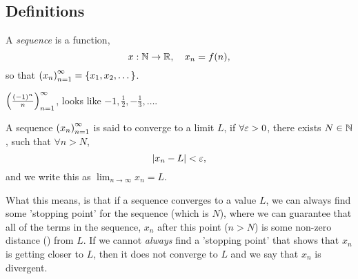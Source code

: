 \documentclass[12pt]{article}
\theoremstyle{definition}
\begin{document}
    \subsection{Definitions}
    \begin{definition}[Sequences]
        A \textit{sequence} is a function,
        \begin{equation*}
            x: \N \rightarrow \R, \quad x_{n} = f(n),
        \end{equation*}
        so that $\left(x_{n}\right)_{n = 1}^{\infty} = \left\{x_{1}, x_{2}, \dots\right\}$.
    \end{definition}
    \begin{eg}
        $\left(\frac{(-1)^{n}}{n}\right)_{n = 1}^{\infty}$, looks like  $-1, \frac{1}{2}, -\frac{1}{3}, \dots$. 
    \end{eg}

    \begin{definition}
        A sequence $\left(x_{n}\right)_{n = 1}^{\infty}$ is said to converge to a limit $L$, if $\forall \varepsilon > 0$, there exists $N \in \mathbb{N}$, such that $\forall n > N$,
        \begin{equation*}
            \left|x_{n} - L\right| < \varepsilon,
        \end{equation*}
        and we write this as $\displaystyle\lim_{n \rightarrow \infty}x_{n} = L$.
    \end{definition}

    What this means, is that if a sequence converges to a value $L$, we can always find some 'stopping point' for the sequence (which is $N$), where we can guarantee that all of the terms in the sequence, $x_{n}$ after this point ($n > N$) is some non-zero distance (\varep) from $L$. If we cannot \textit{always} find a 'stopping point' that shows that $x_{n}$ is getting closer to $L$, then it does not converge to $L$ and we say that $x_{n}$ is divergent.
\end{document}
